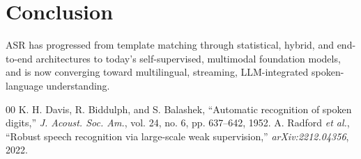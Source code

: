 \documentclass[conference]{IEEEtran}
\begin{document}
\section{Conclusion}
ASR has progressed from template matching through statistical, hybrid, and end-to-end architectures to today's self-supervised, multimodal foundation models, and is now converging toward multilingual, streaming, LLM-integrated spoken-language understanding.

\footnotesize
\begin{thebibliography}{00}
 K. H. Davis, R. Biddulph, and S. Balashek, ``Automatic recognition of spoken digits,'' \emph{J. Acoust. Soc. Am.}, vol. 24, no. 6, pp. 637--642, 1952.
 A. Radford \emph{et al.}, ``Robust speech recognition via large-scale weak supervision,'' \emph{arXiv:2212.04356}, 2022.
\end{thebibliography}
\end{document}
